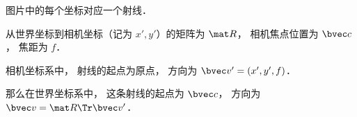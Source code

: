 

图片中的每个坐标对应一个射线．

从世界坐标到相机坐标（记为 $x', y'$）的矩阵为 $\mat R$， 相机焦点位置为 $\bvec c$， 焦距为 $f$．

相机坐标系中， 射线的起点为原点， 方向为 $\bvec v' = (x', y', f)$．

那么在世界坐标系中， 这条射线的起点为 $\bvec c$， 方向为 $\bvec v = \mat R\Tr \bvec v'$．

